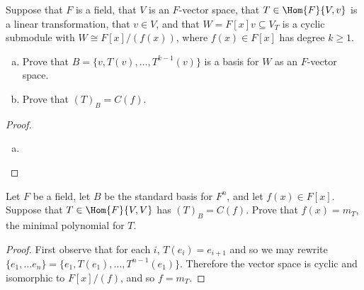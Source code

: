 \documentclass[10pt]{amsart}
\begin{document}
\begin{thm}
  Suppose that $F$ is a field, that $V$ is an $F$-vector space, that $T \in \Hom{F}{V, v}$ is a linear transformation, that $v \in V$, and that $W = F[x]v \subseteq V_T$ is a cyclic submodule with $W \cong F[x] / (f(x))$, where $f(x) \in F[x]$ has degree $k \geq 1$.
  \begin{enumerate}[(a)]
  \item
    Prove that $B = \{v, T(v), \ldots, T^{k-1}(v)\}$ is a basis for $W$ as an $F$-vector space.
  \item
    Prove that $(T)_B = C(f)$.
  \end{enumerate}
  \begin{proof}
    \begin{enumerate}[(a)]
    \item
      
  \end{enumerate}
  \end{proof}
\end{thm}  

\begin{thm}
  Let $F$ be a field, let $B$ be the standard basis for $F^n$, and let $f(x) \in F[x]$.
  Suppose that $T \in \Hom{F}{V,V}$ has $(T)_B = C(f)$.
  Prove that $f(x) = m_T$, the minimal polynomial for $T$.
  
  \begin{proof}
    First observe that for each $i$, $T(e_i) = e_{i+1}$ and so we may rewrite $\{e_1, \ldots e_n\} = \{e_1, T(e_1), \ldots, T^{n-1}(e_1)\}$.
    Therefore the vector space is cyclic and isomorphic to $F[x]/(f)$, and so $f = m_T$.
  \end{proof}
\end{thm}  
\end{document}
